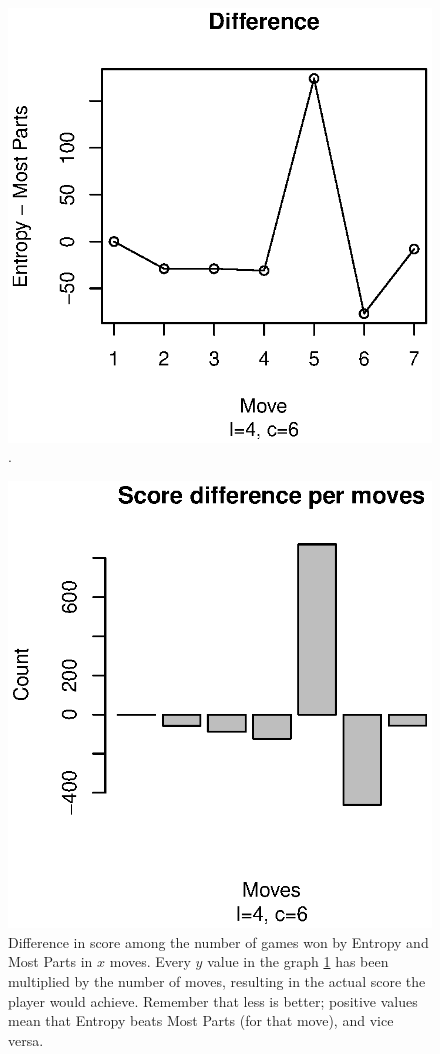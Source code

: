 \documentclass[preprint,12pt]{elsarticle}
\begin{document}
\begin{figure}[!htb]
\centering
\includegraphics{dif-46.eps}
\caption{. \label{fig:dif:me}}
\end{figure}
%
\begin{figure}[!htb]
\centering
\includegraphics{score-dif-46.eps}
\caption{Difference in score among the number of games won by Entropy and Most
  Parts in $x$ moves. Every $y$ value in the graph \ref{fig:dif:me}
  has been multiplied by the number of moves, resulting in the actual
  score the player would achieve. Remember that less is better;
  positive values mean that Entropy beats Most Parts (for that move),
  and vice versa. \label{fig:scoredif:me}}
\end{figure}
%
\end{document}
